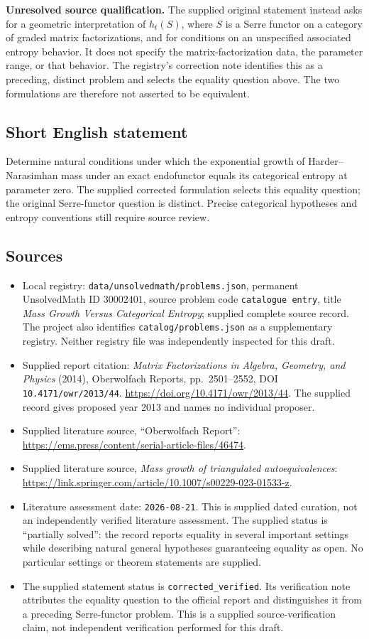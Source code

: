 \documentclass[11pt]{article}
\begin{document}
\textbf{Unresolved source qualification.} The supplied original statement instead asks for a geometric interpretation of \(h_t(S)\), where \(S\) is a Serre functor on a category of graded matrix factorizations, and for conditions on an unspecified associated entropy behavior. It does not specify the matrix-factorization data, the parameter range, or that behavior. The registry's correction note identifies this as a preceding, distinct problem and selects the equality question above. The two formulations are therefore not asserted to be equivalent.
\subsection{Short English statement}
Determine natural conditions under which the exponential growth of Harder--Narasimhan mass under an exact endofunctor equals its categorical entropy at parameter zero. The supplied corrected formulation selects this equality question; the original Serre-functor question is distinct. Precise categorical hypotheses and entropy conventions still require source review.
\subsection{Sources}
\begin{itemize}
\item Local registry: \texttt{data/unsolvedmath/problems.json}, permanent UnsolvedMath ID \(30002401\), source problem code \texttt{catalogue entry}, title \emph{Mass Growth Versus Categorical Entropy}; supplied complete source record. The project also identifies \texttt{catalog/problems.json} as a supplementary registry. Neither registry file was independently inspected for this draft.
\item Supplied report citation: \emph{Matrix Factorizations in Algebra, Geometry, and Physics} (2014), Oberwolfach Reports, pp.\ 2501--2552, DOI \texttt{10.4171/owr/2013/44}. \url{https://doi.org/10.4171/owr/2013/44}. The supplied record gives proposed year 2013 and names no individual proposer.
\item Supplied literature source, ``Oberwolfach Report'': \url{https://ems.press/content/serial-article-files/46474}.
\item Supplied literature source, \emph{Mass growth of triangulated autoequivalences}: \url{https://link.springer.com/article/10.1007/s00229-023-01533-z}.
\item Literature assessment date: \texttt{2026-08-21}. This is supplied dated curation, not an independently verified literature assessment. The supplied status is ``partially solved'': the record reports equality in several important settings while describing natural general hypotheses guaranteeing equality as open. No particular settings or theorem statements are supplied.
\item The supplied statement status is \texttt{corrected\_verified}. Its verification note attributes the equality question to the official report and distinguishes it from a preceding Serre-functor problem. This is a supplied source-verification claim, not independent verification performed for this draft.
\end{itemize}
\end{document}
